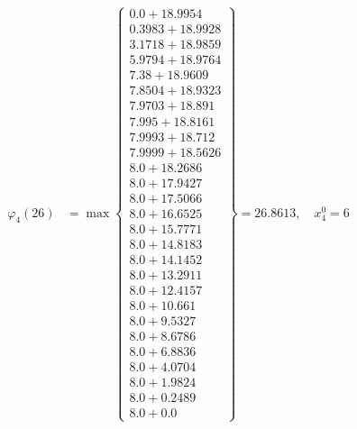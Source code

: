 \documentclass{article}
\begin{document}
\begin{align*}
  
\varphi_{4}(26) &= \max \left\{ \begin{array}{c}
0.0 + 18.9954 \\
 0.3983 + 18.9928 \\
 3.1718 + 18.9859 \\
 5.9794 + 18.9764 \\
 7.38 + 18.9609 \\
 7.8504 + 18.9323 \\
 7.9703 + 18.891 \\
 7.995 + 18.8161 \\
 7.9993 + 18.712 \\
 7.9999 + 18.5626 \\
 8.0 + 18.2686 \\
 8.0 + 17.9427 \\
 8.0 + 17.5066 \\
 8.0 + 16.6525 \\
 8.0 + 15.7771 \\
 8.0 + 14.8183 \\
 8.0 + 14.1452 \\
 8.0 + 13.2911 \\
 8.0 + 12.4157 \\
 8.0 + 10.661 \\
 8.0 + 9.5327 \\
 8.0 + 8.6786 \\
 8.0 + 6.8836 \\
 8.0 + 4.0704 \\
 8.0 + 1.9824 \\
 8.0 + 0.2489 \\
 8.0 + 0.0
\end{array} \right\}=26.8613,\quad x_{4}^0=6\\
  
  
  

\end{align*}
\end{document}
